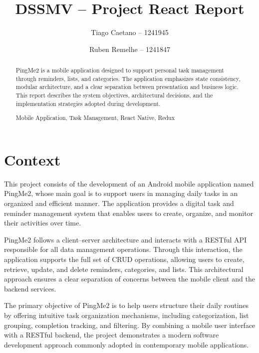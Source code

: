 \documentclass[runningheads,a4paper]{llncs}
\newcommand{\keywords}[1]{\par\addvspace\baselineskip
\noindent\keywordname\enspace\ignorespaces#1}
\begin{document}
\mainmatter

\title{DSSMV -- Project React Report}

\author{Tiago Caetano -- 1241945 \and Ruben Remelhe -- 1241847}


\maketitle

\begin{abstract}
PingMe2 is a mobile application designed to support personal task
management through reminders, lists, and categories. The application
emphasizes state consistency, modular architecture, and a clear
separation between presentation and business logic. This report
describes the system objectives, architectural decisions, and the
implementation strategies adopted during development.
\keywords{Mobile Application, Task Management, React Native, Redux}
\end{abstract}

\section{Context}

This project consists of the development of an Android mobile application named PingMe2, whose main goal is to support users in managing daily tasks in an organized and efficient manner. The application provides a digital task and reminder management system that enables users to create, organize, and monitor their activities over time.

PingMe2 follows a client--server architecture and interacts with a RESTful API responsible for all data management operations. Through this interaction, the application supports the full set of CRUD operations, allowing users to create, retrieve, update, and delete reminders, categories, and lists. This architectural approach ensures a clear separation of concerns between the mobile client and the backend services.

The primary objective of PingMe2 is to help users structure their daily routines by offering intuitive task organization mechanisms, including categorization, list grouping, completion tracking, and filtering. By combining a mobile user interface with a RESTful backend, the project demonstrates a modern software development approach commonly adopted in contemporary mobile applications.
\end{document}
